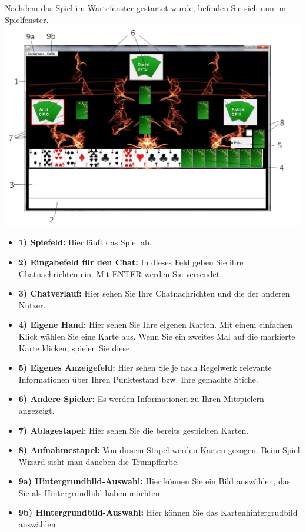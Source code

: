 \documentclass[titlepage,10pt,a4paper]{article}
\begin{document}
Nachdem das Spiel im \gls{Wartefenster} gestartet wurde, befinden Sie sich nun im Spielfenster.\\
\includegraphics[width=\textwidth]{Spiel-Fenster}
\begin{itemize}
	\item \textbf{1) Spiefeld:} Hier läuft das Spiel ab.
	\item \textbf{2) Eingabefeld für den Chat:} In dieses Feld geben Sie ihre Chatnachrichten ein. Mit ENTER werden Sie versendet.
	\item \textbf{3) Chatverlauf:} Hier sehen Sie Ihre Chatnachrichten und die der anderen Nutzer.
	\item \textbf{4) Eigene Hand:} Hier sehen Sie Ihre eigenen Karten. Mit einem einfachen Klick wählen Sie eine Karte aus. Wenn Sie ein zweites Mal auf die markierte Karte klicken, spielen Sie diese.
	\item \textbf{5) Eigenes Anzeigefeld:} Hier sehen Sie je nach Regelwerk relevante Informationen über Ihren Punktestand bzw. Ihre gemachte Stiche.
	\item \textbf{6) Andere Spieler:} Es werden Informationen zu Ihren Mitspielern angezeigt.
	\item \textbf{7) Ablagestapel:} Hier sehen Sie die bereits gespielten Karten.
	\item \textbf{8) Aufnahmestapel:} Von diesem Stapel werden Karten gezogen. Beim Spiel Wizard sieht man daneben die Trumpffarbe.
	\item \textbf{9a) Hintergrundbild-Auswahl:} Hier können Sie ein Bild auswählen, das Sie als Hintergrundbild haben möchten.
	\item \textbf{9b) Hintergrundbild-Auswahl:} Hier können Sie das  Kartenhintergrudbild auswählen
\end{itemize}
\end{document}
